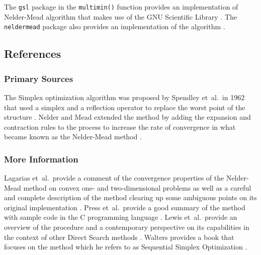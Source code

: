 The \texttt{gsl} package in the \texttt{multimin()} function provides an implementation of Nelder-Mead algorithm that makes use of the GNU Scientific Library \cite{Hankin2011}.
The \texttt{neldermead} package also provides an implementation of the algorithm \cite{Bihorel2011}.

\subsection{References}

\subsubsection{Primary Sources}
The Simplex optimization algorithm was proposed by Spendley et~al.\ in 1962 that used a simplex and a reflection operator to replace the worst point of the structure \cite{Spendley1962}.
Nelder and Mead extended the method by adding the expansion and contraction rules to the process to increase the rate of convergence in what became known as the Nelder-Mead method \cite{Nelder1965}.

\subsubsection{More Information}
Lagarias et~al.\ provide a comment of the convergence properties of the Nelder-Mead method on convex one- and two-dimensional problems as well as a careful and complete description of the method clearing up some ambiguous points on its original implementation \cite{Lagarias1998}. Press et~al.\ provide a good summary of the method with sample code in the C programming language \cite{Press2007}. Lewis et~al.\ provide an overview of the procedure and a contemporary perspective on its capabilities in the context of other Direct Search methods \cite{Lewis2000}.
Walters provides a book that focuses on the method which he refers to as Sequential Simplex Optimization \cite{Walters1991}.

